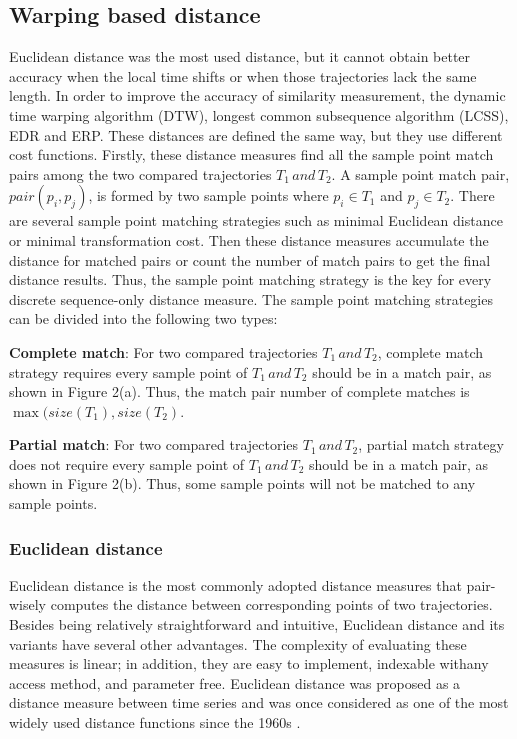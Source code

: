 \documentclass[a4paper, 12pt]{article}
\begin{document}
\subsection{Warping based distance}
Euclidean distance was the most used distance, but it cannot obtain better accuracy when the local time shifts or when those trajectories lack the same length. In order to improve the accuracy of similarity measurement, the dynamic time warping algorithm (DTW), longest common subsequence algorithm (LCSS), EDR and ERP. These distances are defined the same way, but they use different cost functions. Firstly, these distance measures find all the sample point match pairs among the two compared trajectories $T_{1}\,and\,T_{2}$. A sample point match pair, $pair(p_{i},p_{j})$, is formed by two sample points where $p_{i} \in T_{1}$ and $p_{j} \in T_{2}$. There are several sample point matching strategies such as minimal Euclidean distance or minimal transformation cost. Then these distance measures accumulate the distance for matched pairs or count the number of match pairs to get the final distance results. Thus, the sample point matching strategy is the key for every discrete sequence-only distance measure. The sample point matching strategies can be divided into the following two types:

\textbf{Complete match}: For two compared trajectories $T_{1}\,and\,T_{2}$, complete match strategy requires every sample point of $T_{1}\,and\,T_{2}$ should be in a match pair, as shown in Figure 2(a). Thus, the match pair number of complete matches is $\max(size(T_{1}),size(T_{2})$.

\textbf{Partial match}: For two compared trajectories $T_{1}\,and\,T_{2}$, partial match strategy does not require every sample point of $T_{1}\,and\,T_{2}$ should be in a match pair, as shown in Figure 2(b). Thus, some sample points will not be matched to any sample points.

\subsubsection{Euclidean distance}
Euclidean distance is the most commonly adopted distance measures that pair-wisely computes the distance between corresponding points of two trajectories. Besides being relatively straightforward and intuitive, Euclidean distance and its variants have several other advantages. The complexity of evaluating these measures is linear; in addition, they are easy to implement, indexable withany access method, and parameter free. Euclidean distance was proposed as a distance measure between time series and was once considered as one of the most widely used distance functions since the 1960s \citep{keogh2000scaling,faloutsos1994fast,pfeifer1980three,priestley1980state}.
\end{document}
